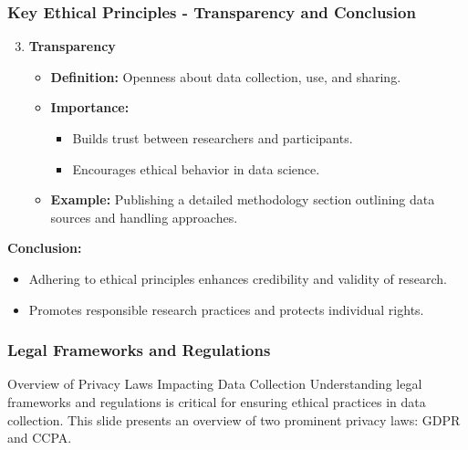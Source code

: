 \documentclass{beamer}
\begin{document}
\begin{frame}[fragile]
    \frametitle{Key Ethical Principles - Transparency and Conclusion}
    \begin{enumerate}
        \setcounter{enumi}{2}
        \item \textbf{Transparency}
            \begin{itemize}
                \item \textbf{Definition:} Openness about data collection, use, and sharing.
                \item \textbf{Importance:}
                    \begin{itemize}
                        \item Builds trust between researchers and participants.
                        \item Encourages ethical behavior in data science.
                    \end{itemize}
                \item \textbf{Example:} Publishing a detailed methodology section outlining data sources and handling approaches.
            \end{itemize}
    \end{enumerate}
    
    \textbf{Conclusion:}
    \begin{itemize}
        \item Adhering to ethical principles enhances credibility and validity of research.
        \item Promotes responsible research practices and protects individual rights.
    \end{itemize}
\end{frame}

\begin{frame}[fragile]
    \frametitle{Legal Frameworks and Regulations}
    \begin{block}{Overview of Privacy Laws Impacting Data Collection}
        Understanding legal frameworks and regulations is critical for ensuring ethical practices in data collection. This slide presents an overview of two prominent privacy laws: GDPR and CCPA.
    \end{block}
\end{frame}
\end{document}
